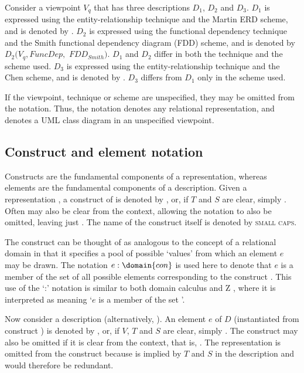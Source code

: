 \documentclass[11pt,oribibl]{llncs}
\newcommand{\ER}{\mathit{E\textrm{-}R}}
\newcommand{\Martin}{\mathit{ERD_{Martin}}}
\newcommand{\Chen}{\mathit{ERD_{Chen}}}
\newcommand{\FD}{\mathit{FuncDep}}
\newcommand{\Smith}{\mathit{FDD_{Smith}}}
\newcommand{\RM}{\mathit{Relational}}
\begin{document}
Consider a viewpoint $V_{q}$ that has three descriptions $D_{1}$, $D_{2}$ and $D_{3}$. $D_{1}$ is expressed using the entity-relationship technique and the Martin ERD scheme, and is denoted by \Description{D_{1}}{V_{q}}{\ER}{\Martin}. $D_{2}$ is expressed using the functional dependency technique and the Smith functional dependency diagram (FDD) scheme, and is denoted by $D_{2}(V_{q},\FD,$ $\Smith)$. $D_{1}$ and $D_{2}$ differ in both the technique and the scheme used. $D_{3}$ is expressed using the entity-relationship technique and the Chen scheme, and is denoted by \Description{D_{3}}{V_{q}}{\ER}{\Chen}. $D_{3}$ differs from $D_{1}$ only in the scheme used.

If the viewpoint, technique or scheme are unspecified, they may be omitted from the notation. Thus, the notation \RepresentationS{R}{r}{\RM}{} denotes any relational representation, and  denotes a UML class diagram in an unspecified viewpoint.


\subsection{Construct and element notation}

Constructs are the fundamental components of a representation, whereas elements are the fundamental components of a description. Given a representation , a construct  of  is denoted by , or, if $T$ and $S$ are clear, simply . Often  may also be clear from the context, allowing the  notation to also be omitted, leaving just . The name of the construct itself is denoted by \textsc{small caps}.

The construct  can be thought of as analogous to the concept of a relational domain in that it specifies a pool of possible `values' from which an element $e$ may be drawn. The notation $e:\domain{con}$ is used here to denote that $e$ is a member of the set of all possible elements corresponding to the construct . This use of the `:' notation is similar to both domain calculus \cite{Date:CJ:2000:IDS} and Z \cite{Brie:SM:1992}, where it is interpreted as meaning `$e$ is a member of the set '.

Now consider a description  (alternatively, ).
An element $e$ of $D$ (instantiated from construct ) is denoted by , or, if $V$, $T$ and $S$ are clear, simply . The construct may also be omitted if it is clear from the context, that is, . The representation  is omitted from the construct  because  is implied by $T$ and $S$ in the description and would therefore be redundant.
\end{document}
